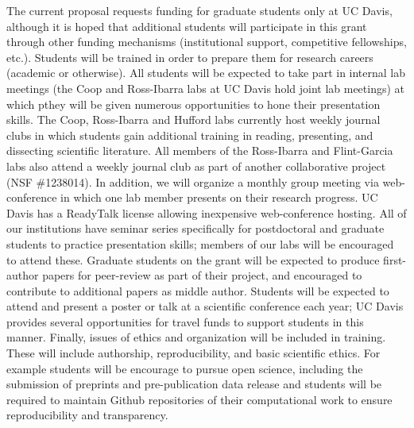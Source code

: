 The current proposal requests funding for graduate students only at UC Davis, although it is hoped that additional students will participate in this grant through other funding mechanisms (institutional support, competitive fellowships, etc.). Students will be trained in order to prepare them for research careers (academic or otherwise).  All students will be expected to take part in internal lab meetings (the Coop and Ross-Ibarra labs at UC Davis hold joint lab meetings) at which pthey will be given numerous opportunities to hone their presentation skills.  The Coop, Ross-Ibarra and Hufford labs currently host weekly journal clubs in which students gain additional training in reading, presenting, and dissecting scientific literature. All members of the Ross-Ibarra and Flint-Garcia labs also attend a weekly journal club as part of another collaborative project (NSF \#1238014). In addition, we will organize a monthly group meeting via web-conference in which one lab member presents on their research progress.  UC Davis has a ReadyTalk license allowing inexpensive web-conference hosting. All of our institutions have seminar series specifically for postdoctoral and graduate students to practice presentation skills; members of our labs will be encouraged to attend these.
Graduate students on the grant will be expected to produce first-author papers for peer-review as part of their project, and encouraged to contribute to additional papers as middle author.  Students will be expected to attend and present a poster or talk at a scientific conference each year; UC Davis provides several opportunities for travel funds to support students in this manner. Finally, issues of ethics and organization will be included in training.  These will include authorship, reproducibility, and basic scientific ethics. For example students will be encourage to pursue open science, including the submission of preprints and pre-publication data release and students will be required to maintain Github repositories of their computational work to ensure reproducibility and transparency.